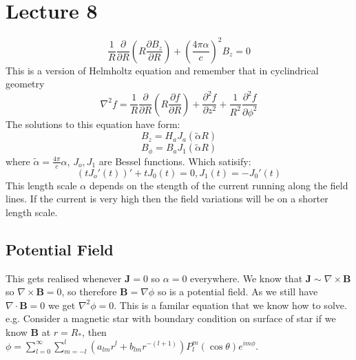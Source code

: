 \documentclass{article}
\begin{document}
\section{Lecture 8}
$$
\frac{1}{R}\frac{\partial}{\partial R}(R \frac{\partial B_z}{\partial R}) + (\frac{4 \pi \alpha}{c})^2 B_z = 0
$$
This is a version of Helmholtz equation and remember that in cyclindrical geometry $$\nabla^2 f = \frac{1}{R} \frac{\partial}{\partial R} (R \frac{\partial f}{\partial R}) + \frac{\partial^2 f}{\partial z^2} + \frac{1}{R^2}\frac{\partial^2 f}{\partial \phi^2}$$
The solutions to this equation have form:
$$
B_z = H_aJ_a(\tilde \alpha R)
$$
$$
B_{\phi} = B_a J_1(\tilde \alpha R)
$$
where $\tilde \alpha = \frac{4 \pi}{c} \alpha$, $J_o, J_1$ are Bessel functions. Which satisify:
$$
(tJ_o'(t))' + tJ_0(t) = 0, J_1(t) = -J_0'(t)
$$
This length scale $\alpha$ depends on the stength of the current running along the field lines. If the current is very high then the field variations will be on a shorter length scale.
\subsection{Potential Field}
This gets realised whenever $\bm J = 0$ so $\alpha = 0$ everywhere. We know that $\bm J \sim \nabla \times \bm B$ so $\nabla \times \bm B = 0$, so therefore $\bm B = \nabla \phi$ so is a potential field. As we still have $\nabla \cdot \bm B = 0$ we get $\nabla^2 \phi = 0$. This is a familar equation that we know how to solve. e.g. Consider a magnetic star with boundary condition on surface of star if we know $\bm B $ at $r = R_*$, then $\phi = \sum_{l=0}^{\infty} \sum_{m=-l}^l (a_{lm}r^l + b_{lm}r^{-(l+1)})P_l^m(\cos \theta) e^{im\phi}$.
\end{document}
